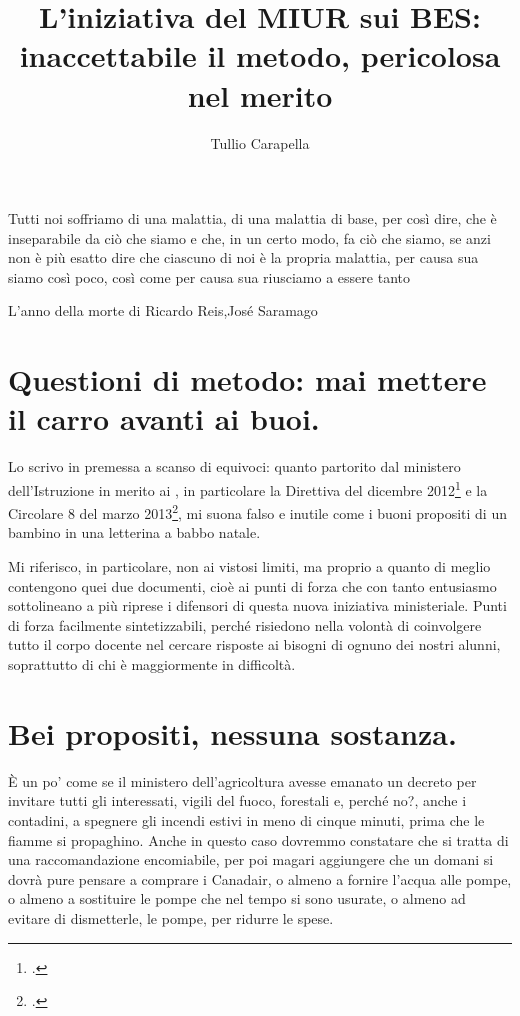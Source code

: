 \author{Tullio Carapella}
\title{L'iniziativa del MIUR sui BES: inaccettabile il metodo, pericolosa nel merito}
\label{cha:TullioCarapella14102013}
\maketitle
{}
\epigraph{Tutti noi soffriamo di una malattia, di una malattia di base, per così dire, che è inseparabile da ciò che siamo e che, in un certo modo, fa ciò che siamo, se anzi non è più esatto dire che ciascuno di noi è la propria malattia, per causa sua siamo così poco, così come per causa sua riusciamo a essere tanto}{L'anno della morte di Ricardo Reis,José Saramago}
\section*{Questioni di metodo: mai mettere il carro avanti ai buoi.}
Lo scrivo in premessa a scanso di equivoci: quanto partorito dal ministero dell'Istruzione in merito ai , in particolare la Direttiva del dicembre 2012\footcite{dir27Dic2012} e la Circolare 8 del marzo 2013\footcite{cm8_2013}, mi suona falso e inutile come i buoni propositi di un bambino in una letterina a babbo natale.

Mi riferisco, in particolare, non ai vistosi limiti, ma proprio a quanto di meglio contengono quei due documenti, cioè ai punti di forza che con tanto entusiasmo sottolineano a più riprese i difensori di questa nuova iniziativa ministeriale. Punti di forza facilmente sintetizzabili, perché risiedono nella volontà di coinvolgere tutto il corpo docente nel cercare risposte ai bisogni di ognuno dei nostri alunni, soprattutto di chi è maggiormente in difficoltà.

\section*{Bei propositi, nessuna sostanza.}
È un po' come se il ministero dell'agricoltura avesse emanato un decreto per invitare tutti gli interessati, vigili del fuoco, forestali e, perché no?, anche i contadini, a spegnere gli incendi estivi in meno di cinque minuti, prima che le fiamme si propaghino. Anche in questo caso dovremmo constatare che si tratta di una raccomandazione encomiabile, per poi magari aggiungere che un domani si dovrà pure pensare a comprare i Canadair, o almeno a fornire l'acqua alle pompe, o almeno a sostituire le pompe che nel tempo si sono usurate, o almeno ad evitare di dismetterle, le pompe, per ridurre le spese.

